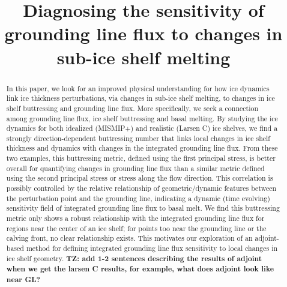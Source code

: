 \documentclass[tc, manuscript]{copernicus}
\begin{document}
\title{Diagnosing the sensitivity of grounding line flux to changes in sub-ice shelf melting}




\received{}
\pubdiscuss{} %
\revised{}
\accepted{}
\published{}

\maketitle
 
\begin{abstract}
In this paper, we look for an improved physical understanding for how ice dynamics link ice thickness perturbations, via changes in sub-ice shelf melting, to changes in ice shelf buttressing and grounding line flux. More specifically, we seek a connection among grounding line flux, ice shelf buttressing and basal melting. By studying the ice dynamics for both idealized (MISMIP+) and realistic (Larsen C) ice shelves, we find a strongly direction-dependent buttressing number that links local changes in ice shelf thickness and dynamics with changes in the integrated grounding line flux. From these two examples, this buttressing metric, defined using the first principal stress, is better overall for quantifying changes in grounding line flux than a similar metric defined using the second principal stress or stress along the flow direction. This correlation is possibly controlled by the relative relationship of geometric/dynamic features between the perturbation point and the grounding line, indicating a dynamic (time evolving) sensitivity field of integrated grounding line flux to basal melt. We find this buttressing metric only shows a robust relationship with the integrated grounding line flux for regions near the center of an ice shelf; for points too near the grounding line or the calving front, no clear relationship exists. This motivates our exploration of an adjoint-based method for defining integrated grounding line flux sensitivity to local changes in ice shelf geometry. \textbf{TZ: add 1-2 sentences describing the results of adjoint when we get the larsen C results, for example, what does adjoint look like near GL?}
\end{abstract}
\end{document}
